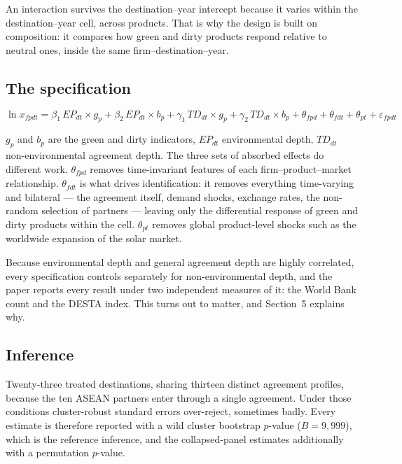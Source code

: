 \documentclass[11pt]{article}
\begin{document}
An interaction survives the destination--year intercept because it varies within the destination--year
cell, across products. That is why the design is built on composition: it compares how green and dirty
products respond relative to neutral ones, inside the same firm--destination--year.

\subsection*{The specification}

\begin{equation*}
\ln x_{fpdt} = \beta_1\, EP_{dt}\!\times\!g_p + \beta_2\, EP_{dt}\!\times\!b_p
+ \gamma_1\, TD_{dt}\!\times\!g_p + \gamma_2\, TD_{dt}\!\times\!b_p
+ \theta_{fpd} + \theta_{fdt} + \theta_{pt} + \varepsilon_{fpdt}
\end{equation*}

$g_p$ and $b_p$ are the green and dirty indicators, $EP_{dt}$ environmental depth, $TD_{dt}$
non-environmental agreement depth. The three sets of absorbed effects do different work.
$\theta_{fpd}$ removes time-invariant features of each firm--product--market relationship.
$\theta_{fdt}$ is what drives identification: it removes everything time-varying and bilateral ---
the agreement itself, demand shocks, exchange rates, the non-random selection of partners --- leaving
only the differential response of green and dirty products within the cell. $\theta_{pt}$ removes
global product-level shocks such as the worldwide expansion of the solar market.

Because environmental depth and general agreement depth are highly correlated, every specification
controls separately for non-environmental depth, and the paper reports every result under two
independent measures of it: the World Bank count and the DESTA index. This turns out to matter, and
Section~5 explains why.

\subsection*{Inference}

Twenty-three treated destinations, sharing thirteen distinct agreement profiles, because the ten
ASEAN partners enter through a single agreement. Under those conditions cluster-robust standard
errors over-reject, sometimes badly. Every estimate is therefore reported with a wild cluster
bootstrap $p$-value ($B = 9{,}999$), which is the reference inference, and the collapsed-panel
estimates additionally with a permutation $p$-value.
\end{document}
